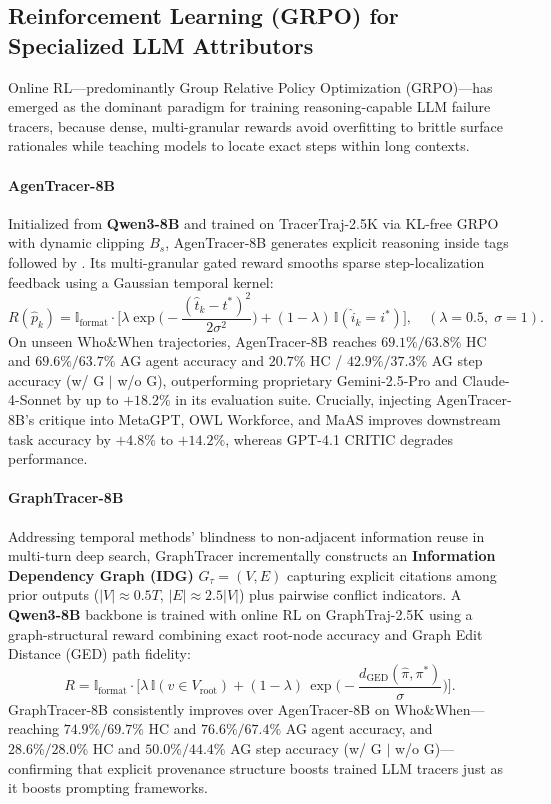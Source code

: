 \subsection{Reinforcement Learning (GRPO) for Specialized LLM Attributors}
Online RL---predominantly Group Relative Policy Optimization (GRPO)---has emerged as the dominant paradigm for training reasoning-capable LLM failure tracers, because dense, multi-granular rewards avoid overfitting to brittle surface rationales while teaching models to locate exact steps within long contexts.

\paragraph{AgenTracer-8B~\citep{zhang2026agentracer}}
Initialized from \textbf{Qwen3-8B} and trained on TracerTraj-2.5K via KL-free GRPO with dynamic clipping $B_s$, AgenTracer-8B generates explicit reasoning inside  tags followed by . Its multi-granular gated reward smooths sparse step-localization feedback using a Gaussian temporal kernel:
\begin{equation}
  R(\hat{p}_k) = \mathbb{I}_{\text{format}} \cdot \Big[ \lambda \exp\!\Big(-\frac{(\hat{t}_k - t^*)^2}{2\sigma^2}\Big) + (1-\lambda)\,\mathbb{I}(\hat{i}_k = i^*) \Big], \quad (\lambda=0.5,\; \sigma=1).
\end{equation}
On unseen Who\&When trajectories, AgenTracer-8B reaches $69.1\%/63.8\%$ HC and $69.6\%/63.7\%$ AG agent accuracy and $20.7\%$ HC / $42.9\%/37.3\%$ AG step accuracy (w/ G $\mid$ w/o G), outperforming proprietary Gemini-2.5-Pro and Claude-4-Sonnet by up to $+18.2\%$ in its evaluation suite. Crucially, injecting AgenTracer-8B's  critique into MetaGPT, OWL Workforce, and MaAS improves downstream task accuracy by $+4.8\%$ to $+14.2\%$, whereas GPT-4.1 CRITIC degrades performance.

\paragraph{GraphTracer-8B~\citep{zhang2025graphtracer}}
Addressing temporal methods' blindness to non-adjacent information reuse in multi-turn deep search, GraphTracer incrementally constructs an \textbf{Information Dependency Graph (IDG)} $G_\tau=(V,E)$ capturing explicit citations among prior outputs ($|V|\approx 0.5T$, $|E|\approx 2.5|V|$) plus pairwise conflict indicators. A \textbf{Qwen3-8B} backbone is trained with online RL on GraphTraj-2.5K using a graph-structural reward combining exact root-node accuracy and Graph Edit Distance (GED) path fidelity:
\begin{equation}
  R = \mathbb{I}_{\text{format}} \cdot \Big[ \lambda\,\mathbb{I}(\hat{v} \in V_{\text{root}}) + (1-\lambda)\,\exp\!\Big(-\frac{d_{\text{GED}}(\hat{\pi}, \pi^*)}{\sigma}\Big) \Big].
\end{equation}
GraphTracer-8B consistently improves over AgenTracer-8B on Who\&When---reaching $74.9\%/69.7\%$ HC and $76.6\%/67.4\%$ AG agent accuracy, and $28.6\%/28.0\%$ HC and $50.0\%/44.4\%$ AG step accuracy (w/ G $\mid$ w/o G)---confirming that explicit provenance structure boosts trained LLM tracers just as it boosts prompting frameworks.

